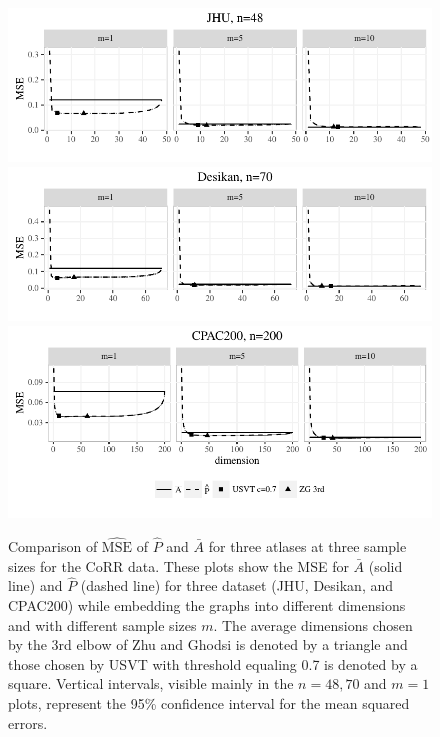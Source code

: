 \begin{figure}[!htbp]
\centering
\includegraphics[width=.99\textwidth]{./Figures/corr_data_MSE_jhu.pdf}\\
\includegraphics[width=.99\textwidth]{./Figures/corr_data_MSE_desikan.pdf}\\
\includegraphics[width=.99\textwidth]{./Figures/corr_data_MSE_CPAC200.pdf}
\caption[Comparison of MSE of two estimators for three atlases at three sample sizes for the CoRR data]{Comparison of $\hat{\mathrm{MSE}}$ of $\hat{P}$ and $\bar{A}$ for three atlases at three sample sizes for the CoRR data.
These plots show the MSE for $\bar{A}$ (solid line) and $\hat{P}$ (dashed line) for three dataset (JHU, Desikan, and CPAC200) while embedding the graphs into different dimensions and with different sample sizes $m$. The average dimensions chosen by the 3rd elbow of Zhu and Ghodsi is denoted by a triangle
 and those chosen by USVT with threshold equaling 0.7 is denoted by a square.
Vertical intervals, visible mainly in the $n=48,70$ and $m=1$ plots, represent the 95\% confidence interval for the mean squared errors. }
\label{fig:LLG_realdata_MSE}
\end{figure}


